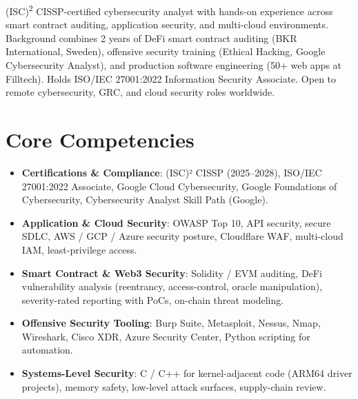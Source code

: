 \documentclass[11pt,a4paper,sans]{moderncv}
\begin{document}
\makecvtitle


\vspace{6pt}
\small{(ISC)\textsuperscript{2} CISSP-certified cybersecurity analyst with hands-on experience across smart contract auditing, application security, and multi-cloud environments. Background combines 2 years of DeFi smart contract auditing (BKR International, Sweden), offensive security training (Ethical Hacking, Google Cybersecurity Analyst), and production software engineering (50+ web apps at Filltech). Holds ISO/IEC 27001:2022 Information Security Associate. Open to remote cybersecurity, GRC, and cloud security roles worldwide.}


\section{Core Competencies}
\vspace{1pt}
\begin{itemize}

\item \textbf{Certifications \& Compliance}: (ISC)² CISSP (2025--2028), ISO/IEC 27001:2022 Associate, Google Cloud Cybersecurity, Google Foundations of Cybersecurity, Cybersecurity Analyst Skill Path (Google).

\item \textbf{Application \& Cloud Security}: OWASP Top 10, API security, secure SDLC, AWS / GCP / Azure security posture, Cloudflare WAF, multi-cloud IAM, least-privilege access.

\item \textbf{Smart Contract \& Web3 Security}: Solidity / EVM auditing, DeFi vulnerability analysis (reentrancy, access-control, oracle manipulation), severity-rated reporting with PoCs, on-chain threat modeling.

\item \textbf{Offensive Security Tooling}: Burp Suite, Metasploit, Nessus, Nmap, Wireshark, Cisco XDR, Azure Security Center, Python scripting for automation.

\item \textbf{Systems-Level Security}: C / C++ for kernel-adjacent code (ARM64 driver projects), memory safety, low-level attack surfaces, supply-chain review.

\end{itemize}
\end{document}
